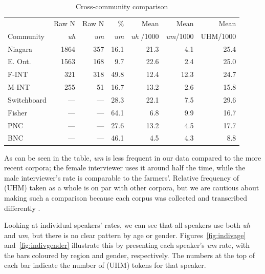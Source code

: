 \documentclass[11pt]{article}
\begin{document}
\begin{table}[ht!]
    \centering
    \begin{tabular}{lrrrrrr}
        \toprule
                    & Raw N       & Raw N       & \%          & Mean              & Mean             & Mean     \\
        Community   & \textit{uh} & \textit{um} & \textit{um} & \textit{uh} /1000 & \textit{um}/1000 & UHM/1000 \\
        \midrule
        Niagara     & 1864        & 357         & 16.1        & 21.3              & 4.1              & 25.4     \\
        E. Ont.     & 1563        & 168         & 9.7         & 22.6              & 2.4              & 25.0     \\
        F-INT       & 321         & 318         & 49.8        & 12.4              & 12.3             & 24.7     \\
        M-INT       & 255         & 51          & 16.7        & 13.2              & 2.6              & 15.8     \\
        \midrule
        Switchboard & ---         & ---         & 28.3        & 22.1              & 7.5              & 29.6     \\
        Fisher      & ---         & ---         & 64.1        & 6.8               & 9.9              & 16.7     \\
        PNC         & ---         & ---         & 27.6        & 13.2              & 4.5              & 17.7     \\
        BNC         & ---         & ---         & 46.1        & 4.5               & 4.3              & 8.8      \\
        \bottomrule
    \end{tabular}
    \caption{Cross-community comparison}
    \label{t:comparison}
\end{table}

As can be seen in the table, \emph{um} is less frequent in our data compared to
the more recent corpora; the female interviewer uses it around half the time,
while the male interviewer's rate is comparable to the farmers'.
Relative frequency of (UHM) taken as a whole is on par with other corpora, but
we are cautious about making such a comparison because each corpus was collected
and transcribed differently \parencite[for related discussion,
see][]{pichler2010}.

Looking at individual speakers' rates, we can see that all speakers use both
\emph{uh} and \emph{um}, but there is no clear pattern by age or gender.
Figures~\ref{fig:indivage} and~\ref{fig:indivgender} illustrate this by
presenting each speaker's \emph{um} rate, with the bars coloured by region and
gender, respectively.
The numbers at the top of each bar indicate the number of (UHM) tokens for that
speaker.
\end{document}
